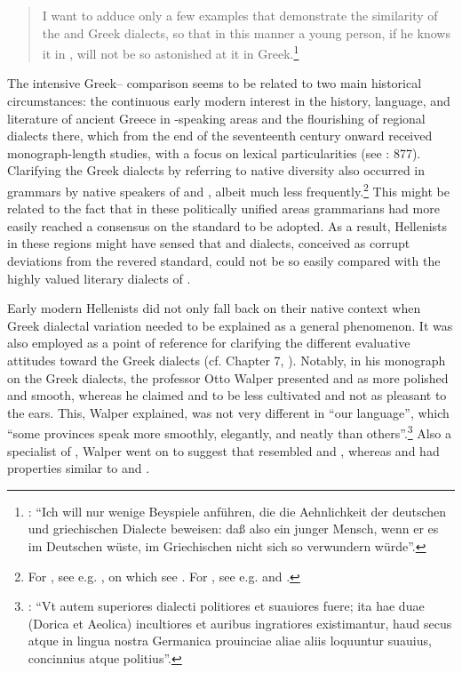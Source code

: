\begin{quote}
I want to adduce only a few examples that demonstrate the similarity of the  and Greek dialects, so that in this manner a young person, if he knows it in , will not be so astonished at it in Greek.\footnote{\citet[229]{Scheller1772}: “Ich will nur wenige Beyspiele anführen, die die Aehnlichkeit der deutschen und griechischen Dialecte beweisen: daß also ein junger Mensch, wenn er es im Deutschen wüste, im Griechischen nicht sich so verwundern würde”.}
\end{quote}

The intensive Greek– comparison seems to be related to two main historical circumstances: the continuous early modern interest in the history, language, and literature of ancient Greece in -speaking areas and the flourishing of regional dialects there, which from the end of the seventeenth century onward received monograph-length studies, with a focus on lexical particularities (see \citealt{Hasler2009}: 877). Clarifying the Greek dialects by referring to native  diversity also occurred in grammars by native speakers of  and , albeit much less frequently.\footnote{For , see e.g. \citet[11--12]{Antesignanus1554}, on which see \citet{VanRooy2016c}. For , see e.g. \citet[191--192]{Milner1734} and \citet[121]{Holmes1735}.} This might be related to the fact that in these politically unified areas grammarians had more easily reached a consensus on the  standard to be adopted. As a result, Hellenists in these regions might have sensed that  and  dialects, conceived as corrupt deviations from the revered standard, could not be so easily compared with the highly valued literary dialects of .

Early modern Hellenists did not only fall back on their native context when Greek dialectal variation needed to be explained as a general phenomenon. It was also employed as a point of reference for clarifying the different evaluative attitudes toward the Greek dialects (cf. Chapter 7, ). Notably, in his monograph on the Greek dialects, the  professor Otto Walper presented  and  as more polished and smooth, whereas he claimed  and  to be less cultivated and not as pleasant to the ears. This, Walper explained, was not very different in “our  language”, which “some provinces speak more smoothly, elegantly, and neatly than others”.\footnote{\citet[61]{Walper1589}: “Vt autem superiores dialecti politiores et suauiores fuere; ita hae duae (Dorica et Aeolica) incultiores et auribus ingratiores existimantur, haud secus atque in lingua nostra Germanica prouinciae aliae aliis loquuntur suauius, concinnius atque politius”.} Also a specialist of , Walper went on to suggest that  resembled  and , whereas  and  had properties similar to  and .

